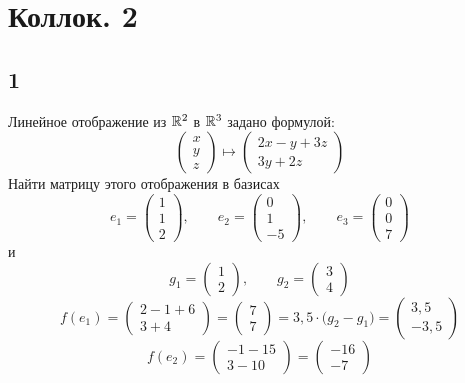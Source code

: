 \chapter{Коллок. 2}

\section{1}

Линейное отображение из $ \mathbb{R}^2 $ в $ \mathbb{R}^3 $ задано формулой:
$$
\begin{pmatrix}
	x \\
    y \\
    z
\end{pmatrix} \mapsto
\begin{pmatrix}
	2x - y + 3z \\
    3y + 2z
\end{pmatrix} $$
Найти матрицу этого отображения в базисах
$$ e_1 =
\begin{pmatrix}
	1 \\
    1 \\
    2
\end{pmatrix}, \qquad e_2 =
\begin{pmatrix}
	0 \\
    1 \\
    -5
\end{pmatrix}, \qquad e_3 =
\begin{pmatrix}
	0 \\
    0 \\
    7
\end{pmatrix} $$
и
$$ g_1 =
\begin{pmatrix}
	1 \\
    2
\end{pmatrix}, \qquad g_2 =
\begin{pmatrix}
	3 \\
    4
\end{pmatrix} $$
$$ f(e_1) =
\begin{pmatrix}
	2 - 1 + 6 \\
    3 + 4
\end{pmatrix} =
\begin{pmatrix}
	7 \\
    7
\end{pmatrix} = 3,5 \cdot \bigg( g_2 - g_1 \bigg) =
\begin{pmatrix}
	3,5 \\
    -3,5
\end{pmatrix} $$
$$ f(e_2) =
\begin{pmatrix}
	-1 - 15 \\
    3 - 10
\end{pmatrix} =
\begin{pmatrix}
	-16 \\
    -7
\end{pmatrix} $$
